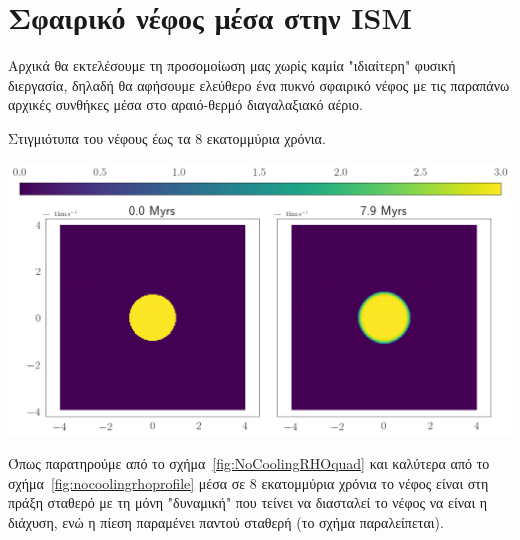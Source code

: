 \documentclass[article,a4paper,11.2pt]{memoir}
\numberwithin{equation}{subsection}
\begin{document}
	
	
	\section{Σφαιρικό νέφος μέσα στην ISM}
	Αρχικά θα εκτελέσουμε τη προσομοίωση μας χωρίς καμία "ιδιαίτερη" φυσική διεργασία,
	δηλαδή θα αφήσουμε ελεύθερο ένα πυκνό σφαιρικό νέφος με τις παραπάνω αρχικές συνθήκες μέσα στο αραιό-θερμό διαγαλαξιακό αέριο.
	
	\begin{marginfigure}
	\caption{Στιγμιότυπα του νέφους έως τα 8 εκατομμύρια χρόνια.}
	\includegraphics[width=1.0\linewidth]{DataImages/NoCoolingRHOquad.png}
	\label{fig:NoCoolingRHOquad}
	\end{marginfigure}	

 Όπως παρατηρούμε από το σχήμα~\ref{fig:NoCoolingRHOquad} και καλύτερα από το σχήμα~\ref{fig:nocoolingrhoprofile} μέσα σε 8 εκατομμύρια χρόνια το νέφος είναι στη πράξη σταθερό με τη μόνη "δυναμική" που τείνει να διασταλεί το νέφος να είναι η διάχυση,  ενώ η πίεση παραμένει παντού σταθερή (το σχήμα παραλείπεται).  
 
\end{document}
